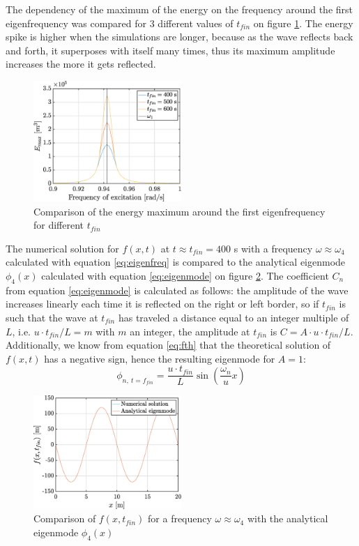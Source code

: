 \documentclass[a4paper,12pt,twoside]{article}
\begin{document}
    The dependency of the maximum of the energy on the frequency around the first eigenfrequency was compared for 3 different values of $t_{fin}$ on figure \ref{fig:Eomcomp}. The energy spike is higher when the simulations are longer, because as the wave reflects back and forth, it superposes with itself many times, thus its maximum amplitude increases the more it gets reflected.
    
    \begin{figure}[h!]
     \centering
     \includegraphics[width=0.5\textwidth]{graphs/Eomcomp.eps}
     \caption{Comparison of the energy maximum around the first eigenfrequency for different $t_{fin}$}
     \label{fig:Eomcomp}
    \end{figure}
    
    The numerical solution for $f(x,t)$ at $t\approx t_{fin} = 400$ s with a frequency $\omega\approx \omega_4$ calculated with equation \eqref{eq:eigenfreq} is compared to the analytical eigenmode $\phi_4(x)$ calculated with equation \eqref{eq:eigenmode} on figure \ref{fig:eigenmode}. The coefficient $C_n$ from equation \eqref{eq:eigenmode} is calculated as follows: the amplitude of the wave increases linearly each time it is reflected on the right or left border, so if $t_{fin}$ is such that the wave at $t_{fin}$ has traveled a distance equal to an integer multiple of $L$, i.e. $u\cdot t_{fin}/L=m$ with $m$ an integer, the amplitude at $t_{fin}$ is $C=A\cdot u\cdot t_{fin}/L$. Additionally, we know from equation \eqref{eq:fth} that the theoretical solution of $f(x,t)$ has a negative sign, hence the resulting eigenmode for $A=1$:
    \begin{equation*}
     \phi_{n,~t=f_{fin}}=\frac{u\cdot t_{fin}}{L} \sin\left(\frac{\omega_n}{u}x\right)
    \end{equation*}

    
    \begin{figure}[h!]
     \centering
     \includegraphics[width=0.5\textwidth]{graphs/eigenmode.eps}
     \caption{Comparison of $f(x,t_{fin})$ for a frequency $\omega\approx \omega_4$ with the analytical eigenmode $\phi_4(x)$}
     \label{fig:eigenmode}
    \end{figure}
    
\end{document}
